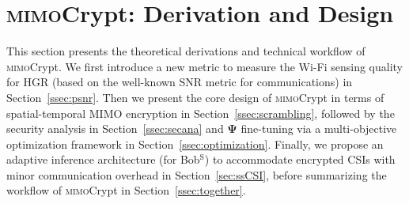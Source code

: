 \documentclass[conference,compsoc]{IEEEtran}
\newcommand{\name}{\textsc{mimo}Crypt\xspace}
\newcommand{\sname}{\textsc{mimo}Crypt\xspace}
\newcommand{\newrev}[1]{{\color{blue}#1}}    %
\newcommand{\newrev}[1]{#1}
\begin{document}
\vspace{-.5ex}
\section{\name: Derivation and Design} \label{sec:sys}
\vspace{-1ex}
%
This section presents the theoretical derivations and technical workflow of \sname.
%
%
%
\newrev{
We first introduce a new metric to measure the Wi-Fi sensing quality for HGR (based on the well-known SNR metric for communications) in Section~\ref{ssec:psnr}.
Then we present the core design of \sname in terms of spatial-temporal MIMO encryption in Section~\ref{ssec:scrambling}, followed by the security analysis in Section~\ref{ssec:secana} and 
%
$\bm{\Psi}$ fine-tuning via a multi-objective optimization framework in Section~\ref{ssec:optimization}.
Finally, we propose 
an adaptive inference architecture (for Bob$^{\mathrm{S}}$) to accommodate encrypted CSIs with minor communication overhead in Section~\ref{sec:ssCSI}, before summarizing the workflow of \name in Section~\ref{ssec:together}.
}
\end{document}
